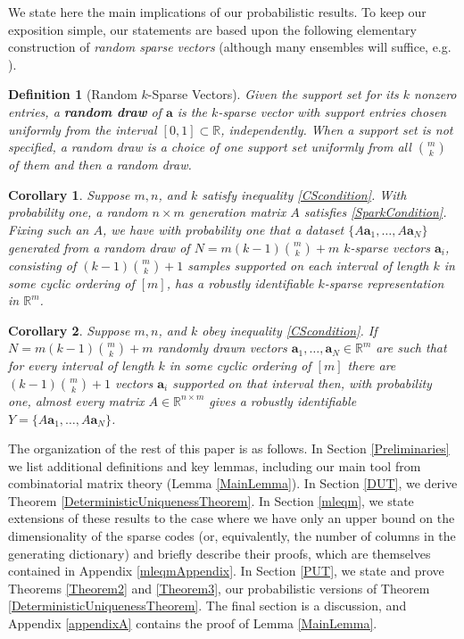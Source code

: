\documentclass[journal, onecolumn]{IEEEtran}
\newtheorem{definition}{Definition}
\newtheorem{corollary}{Corollary}
\begin{document}
We state here the main implications of our probabilistic results. To keep our exposition simple, our statements are based upon the following elementary construction of \emph{random sparse vectors} (although many ensembles will suffice, e.g. \cite[Sec.~\S 4]{baraniuk2008simple}).

\begin{definition}[Random $k$-Sparse Vectors]\label{RandomDraw}
Given the support set for its $k$ nonzero entries, a \textbf{random draw} of $\mathbf{a}$ is the $k$-sparse vector with support entries chosen uniformly from the interval $[0, 1] \subset \mathbb{R}$, independently. When a support set is not specified, a random draw is a choice of one support set uniformly from all ${m \choose k}$ of them and then a random draw.
\end{definition}

\begin{corollary}
Suppose $m, n$, and $k$ satisfy inequality \eqref{CScondition}. With probability one, a random $n \times m$ generation matrix $A$ satisfies \eqref{SparkCondition}. Fixing such an $A$, we have with probability one that a dataset $\{A\mathbf{a}_1, \ldots , A\mathbf{a}_N\}$ generated from a random draw of $N = m(k-1){m \choose k}+m$ $k$-sparse vectors $\mathbf{a}_i$, consisting of $(k-1){m \choose k}+1$ samples supported on each interval of length $k$ in some cyclic ordering of $[m]$, has a robustly identifiable $k$-sparse representation in $\mathbb{R}^m$.
\end{corollary}

\begin{corollary}
Suppose $m, n$, and $k$ obey inequality \eqref{CScondition}.  If $N = m(k-1){m \choose k}+m$ randomly drawn vectors $\mathbf{a}_1, \ldots, \mathbf{a}_N \in \mathbb{R}^m$ are such that for every interval of length $k$ in some cyclic ordering of $[m]$ there are $(k-1){m \choose k}+1$ vectors $\mathbf{a}_i$ supported on that interval then, with probability one, almost every matrix $A \in \mathbb{R}^{n \times m}$ gives a robustly identifiable $Y = \{A\mathbf{a}_1, \ldots , A\mathbf{a}_N \}$.
\end{corollary}

The organization of the rest of this paper is as follows. In Section \ref{Preliminaries} we list additional definitions and key lemmas, including our main tool from combinatorial matrix theory (Lemma \ref{MainLemma}). In Section \ref{DUT}, we derive Theorem \ref{DeterministicUniquenessTheorem}. In Section \ref{mleqm}, we state extensions of these results to the case where we have only an upper bound on the dimensionality of the sparse codes (or, equivalently, the number of columns in the generating dictionary) and briefly describe their proofs, which are themselves contained in Appendix \ref{mleqmAppendix}. In Section \ref{PUT}, we state and prove Theorems \ref{Theorem2} and \ref{Theorem3}, our probabilistic versions of Theorem \ref{DeterministicUniquenessTheorem}. The final section is a discussion, and Appendix \ref{appendixA} contains the proof of Lemma \ref{MainLemma}.
\end{document}

